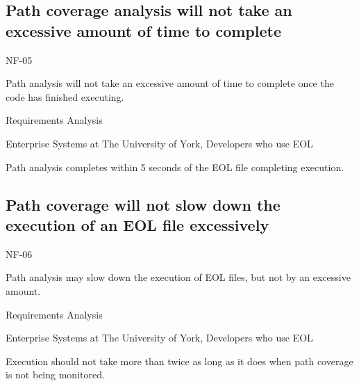 \subsection{Path coverage analysis will not take an excessive amount of time to complete}
\begin{description}[style=sameline,leftmargin=4.5cm,nolistsep]
\item[\hspace*{0.3cm}Label] NF-05
\item[\hspace*{0.3cm}Description] Path analysis will not take an excessive amount of time to complete once the code has finished executing.
\item[\hspace*{0.3cm}Source] Requirements Analysis
\item[\hspace*{0.3cm}Stakeholders] Enterprise Systems at The University of York, Developers who use EOL
\item[\hspace*{0.3cm}Satisfiable Conditions] Path analysis completes within 5 seconds of the EOL file completing execution.
\end{description}

\subsection{Path coverage will not slow down the execution of an EOL file excessively}
\begin{description}[style=sameline,leftmargin=4.5cm,nolistsep]
\item[\hspace*{0.3cm}Label] NF-06
\item[\hspace*{0.3cm}Description] Path analysis may slow down the execution of EOL files, but not by an excessive amount.
\item[\hspace*{0.3cm}Source] Requirements Analysis
\item[\hspace*{0.3cm}Stakeholders] Enterprise Systems at The University of York, Developers who use EOL
\item[\hspace*{0.3cm}Satisfiable Conditions] Execution should not take more than twice as long as it does when path coverage is not being monitored.
\end{description}

